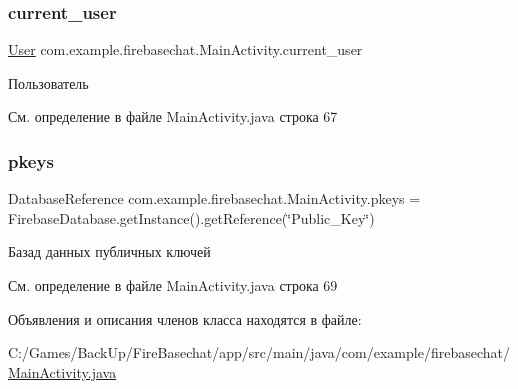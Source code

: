 \subsubsection{\texorpdfstring{current\+\_\+user}{current\_user}}
{\footnotesize\ttfamily \mbox{\hyperlink{classcom_1_1example_1_1firebasechat_1_1_user}{User}} com.\+example.\+firebasechat.\+Main\+Activity.\+current\+\_\+user\hspace{0.3cm}{\ttfamily [static]}}



Пользователь 



См. определение в файле Main\+Activity.\+java строка 67

\mbox{\label{classcom_1_1example_1_1firebasechat_1_1_main_activity_a058a21d2029c7bfbb3365c50b621e043}} 
\subsubsection{\texorpdfstring{pkeys}{pkeys}}
{\footnotesize\ttfamily Database\+Reference com.\+example.\+firebasechat.\+Main\+Activity.\+pkeys = Firebase\+Database.\+get\+Instance().get\+Reference(\char`\"{}Public\+\_\+\+Key\char`\"{})}



Базад данных публичных ключей 



См. определение в файле Main\+Activity.\+java строка 69



Объявления и описания членов класса находятся в файле\+:\begin{DoxyCompactItemize}
\item 
C\+:/\+Games/\+Back\+Up/\+Fire\+Basechat/app/src/main/java/com/example/firebasechat/\mbox{\hyperlink{_main_activity_8java}{Main\+Activity.\+java}}\end{DoxyCompactItemize}
